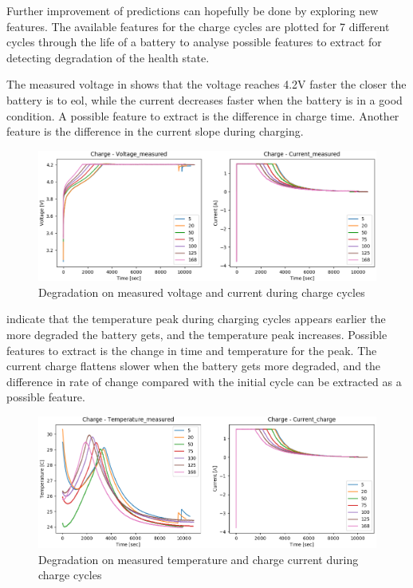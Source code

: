 \documentclass[english, a4paper]{report}
\begin{document}
{{{{                Further improvement of predictions can hopefully be done by exploring new features. The available features for the charge cycles are plotted for 7 different cycles through the life of a battery to analyse possible features to extract for detecting degradation of the health state. 
                \par
                The measured voltage in  shows that the voltage reaches 4.2V faster the closer the battery is to \gls{eol}, while the current decreases faster when the battery is in a good condition. A possible feature to extract is the difference in charge time. Another feature is the difference in the current slope during charging.
            
                \begin{figure}[H]
                    \centering \includegraphics[width=1\textwidth]{ChargeDegradation1}
                    \caption{Degradation on measured voltage and current during charge cycles}
                    \label{fig:ChargeDegradation1}
                \end{figure}
                
                 indicate that the temperature peak during charging cycles appears earlier the more degraded the battery gets, and the temperature peak increases. Possible features to extract is the change in time and temperature for the peak. The current charge flattens slower when the battery gets more degraded, and the difference in rate of change compared with the initial cycle can be extracted as a possible feature.
                
                \begin{figure}[H]
                    \centering \includegraphics[width=1\textwidth]{ChargeDegradation2}
                    \caption{Degradation on measured temperature and charge current during charge cycles}
                    \label{fig:ChargeDegradation2}
                \end{figure}
                
}}}}
\end{document}
